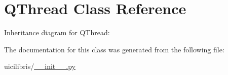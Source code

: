 \hypertarget{classQThread}{\section{\-Q\-Thread \-Class \-Reference}
\label{classQThread}
}


\-Inheritance diagram for \-Q\-Thread\-:


\-The documentation for this class was generated from the following file\-:\begin{DoxyCompactItemize}
\item 
uicilibris/\hyperlink{____init_____8py}{\-\_\-\-\_\-init\-\_\-\-\_\-.\-py}\end{DoxyCompactItemize}
